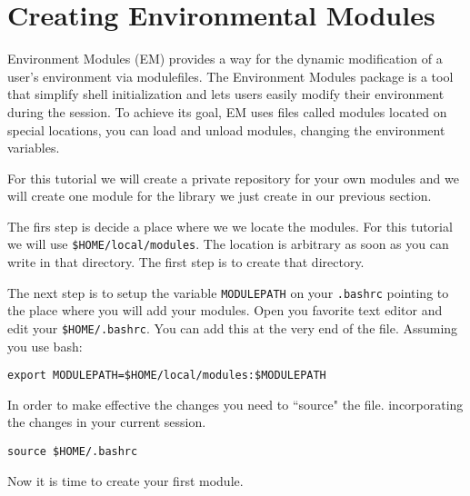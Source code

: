 \section{Creating Environmental Modules}

Environment Modules (EM) provides a way for the dynamic modification of a user's environment via modulefiles.
The Environment Modules package is a tool that simplify shell initialization and lets users easily modify their environment during the session.
To achieve its goal, EM uses files called modules located on special locations, you can load and unload modules, changing the environment variables.

For this tutorial we will create a private repository for your own modules and we will create one module for the library we just create in our previous section.

The firs step is decide a place where we we locate the modules. For this tutorial we will use \verb|$HOME/local/modules|. The location is arbitrary as soon as you can write in that directory. The first step is to create that directory.

The next step is to setup the variable \texttt{MODULEPATH} on your \texttt{.bashrc} pointing to the place where you will add your modules. Open you favorite text editor and edit your \verb|$HOME/.bashrc|. You can add this at the very end of the file. Assuming you use bash:

\begin{lstlisting}
export MODULEPATH=$HOME/local/modules:$MODULEPATH
\end{lstlisting}

In order to make effective the changes you need to ``source" the file. incorporating the changes in your current session.

\begin{lstlisting}
source $HOME/.bashrc
\end{lstlisting}

Now it is time to create your first module. 





